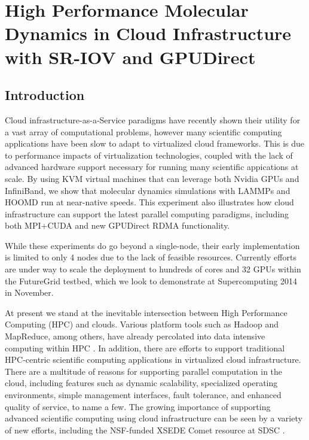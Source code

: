 


\chapter{High Performance Molecular Dynamics in Cloud Infrastructure with SR-IOV and GPUDirect}
\label{chap:lammps-scaling}



\section{Introduction}


Cloud infrastructure-as-a-Service paradigms have recently shown their utility for a vast array of computational problems, however many scientific computing applications have been slow to adapt to virtualized cloud frameworks. This is due to performance impacts of virtualization technologies, coupled with the lack of advanced hardware support necessary for running many scientific appications at scale. By using KVM virtual machines that can leverage both Nvidia GPUs and InfiniBand, we show that molecular dynamics simulations with LAMMPs and HOOMD run at near-native speeds. This experiment also illustrates how cloud infrastructure can support the latest parallel computing paradigms, including both MPI+CUDA and new GPUDirect RDMA functionality.

While these experiments do go beyond a single-node, their early implementation is limited to only 4 nodes due to the lack of feasible resources. Currently efforts are under way to scale the deployment to hundreds of cores and 32 GPUs within the FutureGrid testbed, which we look to demonstrate at Supercomputing 2014 in November. 


At present we stand at the inevitable intersection between High Performance Computing (HPC) and clouds. Various platform tools such as Hadoop and MapReduce, among others, have already percolated into data intensive computing within HPC \cite{jha2014apache}.  In addition, there are efforts to support traditional HPC-centric scientific computing applications in virtualized cloud infrastructure.  There are a multitude of reasons for supporting parallel computation in the cloud\cite{Armbrust2010}, including features such as dynamic scalability, specialized operating environments, simple management interfaces, fault tolerance, and enhanced quality of service, to name a few. The growing importance of supporting advanced scientific computing using cloud infrastructure can be seen by a variety of new efforts, including the NSF-funded XSEDE Comet resource at SDSC \cite{sdsc2014comet}.  

